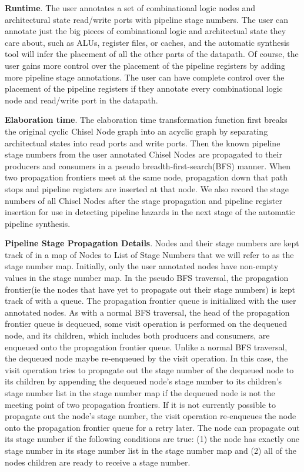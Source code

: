 {\bf Runtime}. The user annotates a set of combinational logic nodes
and architectural state read/write ports with pipeline stage
numbers. The user can annotate just the big pieces of combinational
logic and architectual state they care about, such as ALUs, register
files, or caches, and the automatic synthesis tool will infer the
placement of all the other parts of the datapath. Of course, the user
gains more control over the placement of the pipeline registers by
adding more pipeline stage annotations. The user can have complete
control over the placement of the pipeline registers if they annotate
every combinational logic node and read/write port in the datapath. 

{\bf Elaboration time}. The elaboration time transformation function
first breaks the original cyclic Chisel Node graph into an acyclic
graph by separating architectual states into read ports and write
ports. Then the known pipeline stage numbers from the user annotated
Chisel Nodes are propagated to their producers and consumers in a
pseudo breadth-first-search(BFS) manner. When two propagation
frontiers meet at the same node, propagation down that path stops and
pipeline registers are inserted at that node. We also record the stage
numbers of all Chisel Nodes after the stage propagation and pipeline
register insertion for use in detecting pipeline hazards in the next
stage of the automatic pipeline synthesis. 

{\bf Pipeline Stage Propagation Details}. Nodes and their stage
numbers are kept track of in a map of Nodes to List of Stage Numbers
that we will refer to as the stage number map. Initially, only the
user annotated nodes have non-empty values in the stage number map. In
the pseudo BFS traversal, the propagation frontier(ie the nodes that
have yet to propagate out their stage numbers) is kept track of with a
queue. The propagation frontier queue is initialized with the user
annotated nodes. As with a normal BFS traversal, the head of the
propagation frontier queue is dequeued, some visit operation is
performed on the dequeued node, and its children, which includes both
producers and consumers, are enqueued onto the propagation frontier
queue. Unlike a normal BFS traversal, the dequeued node maybe
re-enqueued by the visit operation. In this case, the visit operation
tries to propagate out the stage number of the dequeued node to its
children by appending the dequeued node's stage number to its
children's stage number list in the stage number map if the dequeued
node is not the meeting point of two propagation frontiers. If it is
not currently possible to propagate out the node's stage number, the
visit operation re-enqueues the node onto the propagation frontier
queue for a retry later. The node can propagate out its stage number
if the following conditions are true: (1) the node has exactly one
stage number in its stage number list in the stage number map and (2)
all of the nodes children are ready to receive a stage number.  

